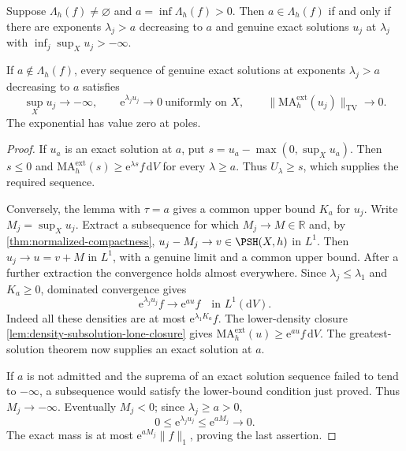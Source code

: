 \begin{proposition}\label{prop:positive-exponent-endpoint-attainment}
Suppose $\Lambda_h(f)\ne\varnothing$ and $a=\inf\Lambda_h(f)>0$. Then $a\in\Lambda_h(f)$ if and only if there are exponents $\lambda_j>a$ decreasing to $a$ and genuine exact solutions $u_j$ at $\lambda_j$ with $\inf_j\sup_Xu_j> -\infty$.

If $a\notin\Lambda_h(f)$, every sequence of genuine exact solutions at exponents $\lambda_j>a$ decreasing to $a$ satisfies
\[
 \sup_Xu_j\longrightarrow-\infty,\qquad
 \mathrm e^{\lambda_ju_j}\longrightarrow0\ \text{uniformly on }X,
 \qquad
 \|\mathrm{MA}^{\mathrm{ext}}_h(u_j)\|_{\mathrm{TV}}
                \longrightarrow0.
\]
The exponential has value zero at poles.
\end{proposition}
\begin{proof}
If $u_a$ is an exact solution at $a$, put $s=u_a-\max(0,\sup_Xu_a)$. Then $s\leq0$ and $\mathrm{MA}^{\mathrm{ext}}_h(s)\geq\mathrm e^{\lambda s}f\,\mathrm dV$ for every $\lambda\geq a$. Thus $U_\lambda\geq s$, which supplies the required sequence.

Conversely, the lemma with $\tau=a$ gives a common upper bound $K_a$ for $u_j$. Write $M_j=\sup_Xu_j$. Extract a subsequence for which $M_j\to M\in\mathbb R$ and, by \cref{thm:normalized-compactness}, $u_j-M_j\to v\in\PSH(X,h)$ in $L^1$. Then $u_j\to u=v+M$ in $L^1$, with a genuine limit and a common upper bound. After a further extraction the convergence holds almost everywhere. Since $\lambda_j\leq\lambda_1$ and $K_a\geq0$, dominated convergence gives
\[
 \mathrm e^{\lambda_ju_j}f\longrightarrow\mathrm e^{au}f
              \quad\text{in }L^1(\mathrm dV).
\]
Indeed all these densities are at most $\mathrm e^{\lambda_1K_a}f$. The lower-density closure \cref{lem:density-subsolution-lone-closure} gives $\mathrm{MA}^{\mathrm{ext}}_h(u)\geq\mathrm e^{au}f\,\mathrm dV$. The greatest-solution theorem now supplies an exact solution at $a$.

If $a$ is not admitted and the suprema of an exact solution sequence failed to tend to $-\infty$, a subsequence would satisfy the lower-bound condition just proved. Thus $M_j\to-\infty$. Eventually $M_j<0$; since $\lambda_j\geq a>0$,
\[
 0\leq\mathrm e^{\lambda_ju_j}\leq\mathrm e^{aM_j}
                 \longrightarrow0.
\]
The exact mass is at most $\mathrm e^{aM_j}\|f\|_1$, proving the last assertion.
\end{proof}

